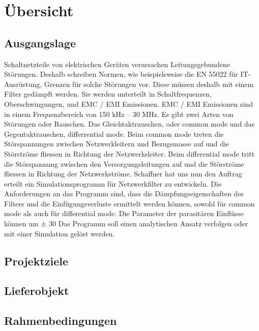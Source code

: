\section{Übersicht} \label{sec:uebersicht}
\subsection{Ausgangslage}

Schaltnetzteile von elektrischen Geräten verursachen Leitungsgebundene Störungen. Deshalb schreiben Normen, wie beispielsweise die EN 55022 für IT-Ausrüstung, Grenzen für solche Störungen vor. Diese müssen deshalb mit einem Filter gedämpft werden. Sie werden unterteilt in Schaltfrequenzen, Oberschwingungen, und EMC / EMI Emissionen. EMC / EMI Emissionen sind in einem Frequenzbereich von 150 kHz – 30 MHz. Es gibt zwei Arten von Störungen oder Rauschen. Das Gleichtaktrauschen, oder common mode und das Gegentaktrauschen, differrential mode. Beim common mode treten die Störspannungen zwischen Netzwerkleitern und Bezugsmasse auf und die Störströme fliessen in Richtung der Netzwerksleiter. Beim differential mode tritt die Störspannung zwischen den Versorgungsleitungen auf und die Störströme fliessen in Richtung der Netzwerkströme.
Schaffner hat uns nun den Auftrag erteilt ein Simulationsprogramm für Netzwerkfilter zu entwickeln. Die Anforderungen an das Programm sind, dass die Dämpfungseigenschaften des Filters und die Einfügungsverluste ermittelt werden können, sowohl für common mode als auch für differential mode. Die Parameter der parasitären Einflüsse können um ± 30 %
Das Programm soll einen analytischen Ansatz verfolgen oder mit einer Simulation gelöst werden. 



\subsection{Projektziele} \label{subsec:projektziele}

\subsection{Lieferobjekt} \label{subsec:lieferobjekt}

\subsection{Rahmenbedingungen} \label{subsec:rahmenbedingungen}